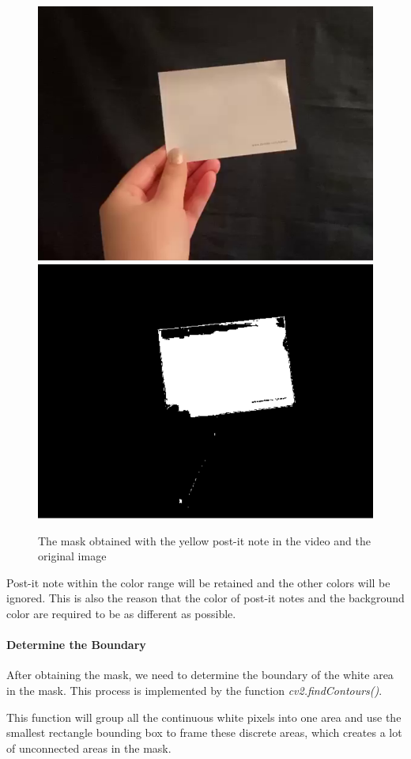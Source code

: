 \documentclass[a4paper, twoside]{report}
\begin{document}
{{\begin{figure}[h!]
\centering
\includegraphics[width=.45\textwidth]{mask.png}
\includegraphics[width=.45\textwidth]{mask1.png}
\caption{The mask obtained with the yellow post-it note in the video and the original image}
\end{figure}

\noindent Post-it note within the color range will be retained and the other colors will be ignored. This is also the reason that the color of post-it notes and the background color are required to be as different as possible.      \\ \par


\newpage
\paragraph{Determine the Boundary} After obtaining the mask, we need to determine the boundary of the white area in the mask. This process is implemented by the function \textit{cv2.findContours()}.      \\ \par


\noindent This function will group all the continuous white pixels into one area and use the smallest rectangle bounding  box to frame these discrete areas, which creates a lot of unconnected areas in the mask. \\ \par

}}
\end{document}
